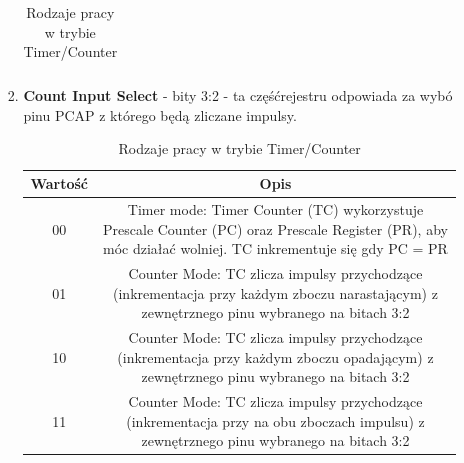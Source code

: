 \begin{enumerate}
\begin{enumerate}
\begin{enumerate}
\begin{table}[H]
\begin{tabular}{|c|c|}
                    \hline
                \end{tabular}
                \caption{Rodzaje pracy w trybie Timer/Counter}
            \end{table}
            \item \textbf{Count Input Select} - bity 3:2 - ta częśćrejestru odpowiada za wybó pinu PCAP z którego będą zliczane impulsy.\\
            \begin{table}[H]
                \centering
                \begin{tabular}{|c|c|}
                    \hline
                    Wartość & Opis\\
                    \hline
                    00  & Timer mode: Timer Counter (TC) wykorzystuje Prescale Counter (PC) oraz Prescale Register (PR), aby móc działać wolniej. TC inkrementuje się gdy PC = PR\\
                    01 & Counter Mode: TC zlicza impulsy przychodzące (inkrementacja przy każdym zboczu narastającym) z zewnętrznego pinu wybranego na bitach 3:2  \\
                    10 & Counter Mode: TC zlicza impulsy przychodzące (inkrementacja przy każdym zboczu opadającym) z zewnętrznego pinu wybranego na bitach 3:2  \\
                    11 & Counter Mode: TC zlicza impulsy przychodzące (inkrementacja przy na obu zboczach impulsu) z zewnętrznego pinu wybranego na bitach 3:2  \\
                    \hline
                \end{tabular}
                \caption{Rodzaje pracy w trybie Timer/Counter}
            \end{table}
            

\end{enumerate}
\end{enumerate}
\end{enumerate}
